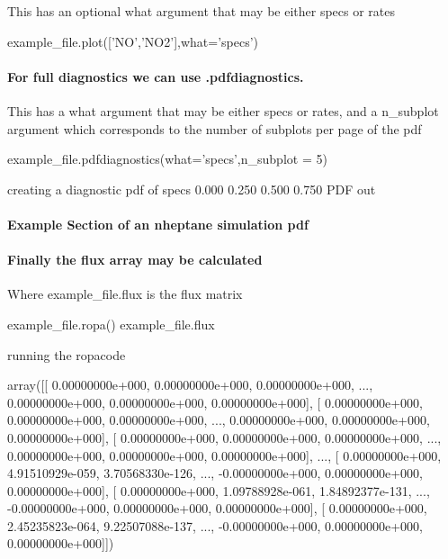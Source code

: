 This has an optional {\ttfamily what} argument that may be either specs or rates


\begin{DoxyCode}
example\_file.plot(['NO','NO2'],what='specs')
\end{DoxyCode}




\paragraph*{For full diagnostics we can use {\ttfamily .pdfdiagnostics}.}

This has a {\ttfamily what} argument that may be either specs or rates, and a {\ttfamily n\+\_\+subplot} argument which corresponds to the number of subplots per page of the pdf


\begin{DoxyCode}
example\_file.pdfdiagnostics(what='specs',n\_subplot = 5)
\end{DoxyCode}
 \begin{DoxyVerb}creating a diagnostic pdf of specs
0.000 %
0.250 %
0.500 %
0.750 %
PDF out
\end{DoxyVerb}


\paragraph*{Example Section of an nheptane simulation pdf}



\paragraph*{Finally the flux array may be calculated}

Where {\ttfamily example\+\_\+file.\+flux} is the flux matrix


\begin{DoxyCode}
example\_file.ropa()
example\_file.flux
\end{DoxyCode}
 \begin{DoxyVerb}running the ropacode





array([[  0.00000000e+000,   0.00000000e+000,   0.00000000e+000, ...,
          0.00000000e+000,   0.00000000e+000,   0.00000000e+000],
       [  0.00000000e+000,   0.00000000e+000,   0.00000000e+000, ...,
          0.00000000e+000,   0.00000000e+000,   0.00000000e+000],
       [  0.00000000e+000,   0.00000000e+000,   0.00000000e+000, ...,
          0.00000000e+000,   0.00000000e+000,   0.00000000e+000],
       ..., 
       [  0.00000000e+000,   4.91510929e-059,   3.70568330e-126, ...,
         -0.00000000e+000,   0.00000000e+000,   0.00000000e+000],
       [  0.00000000e+000,   1.09788928e-061,   1.84892377e-131, ...,
         -0.00000000e+000,   0.00000000e+000,   0.00000000e+000],
       [  0.00000000e+000,   2.45235823e-064,   9.22507088e-137, ...,
         -0.00000000e+000,   0.00000000e+000,   0.00000000e+000]])
\end{DoxyVerb}


